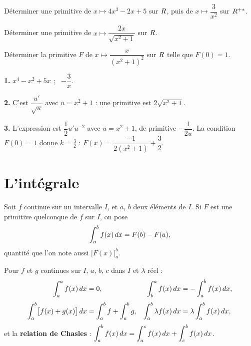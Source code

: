 \begin{entrainement}[primitives]
\exo[\niveau{1}] Déterminer une primitive de $x \mapsto 4x^{3}-2x+5$ sur $R$,
puis de $x \mapsto \dfrac{3}{x^{2}}$ sur $R^{+*}$.

\exo[\niveau{2}] Déterminer une primitive de
$x \mapsto \dfrac{2x}{\sqrt{x^{2}+1}}$ sur $R$.

\exo[\niveau{3}] Déterminer la primitive $F$ de
$x \mapsto \dfrac{x}{\left(x^{2}+1\right)^{2}}$ sur $R$ telle que $F(0) = 1$.
\end{entrainement}

\begin{corrige}
\textbf{1.} $x^{4}-x^{2}+5x$ ; \ $-\dfrac{3}{x}$.

\textbf{2.} C'est $\dfrac{u'}{\sqrt{u}}$ avec $u = x^{2}+1$ : une primitive est
$2\sqrt{x^{2}+1}$.

\textbf{3.} L'expression est $\dfrac{1}{2}u'u^{-2}$ avec $u = x^{2}+1$, de
primitive $-\dfrac{1}{2u}$. La condition $F(0)=1$ donne $k = \tfrac32$ :
$F(x) = \dfrac{-1}{2(x^{2}+1)} + \dfrac{3}{2}$.
\end{corrige}

\section{L'intégrale}

\begin{definition}
Soit $f$ continue sur un intervalle $I$, et $a$, $b$ deux éléments de $I$. Si
$F$ est une primitive quelconque de $f$ sur $I$, on pose
\[
  \int_{a}^{b} f(x)\,dx = F(b)-F(a),
\]
quantité que l'on note aussi $\bigl[F(x)\bigr]_{a}^{b}$.
\end{definition}

\begin{propriete}
Pour $f$ et $g$ continues sur $I$, $a$, $b$, $c$ dans $I$ et $\lambda$ réel :
\begin{align*}
  \int_{a}^{a} f(x)\,dx &= 0, &
  \int_{b}^{a} f(x)\,dx &= -\int_{a}^{b} f(x)\,dx, \\[0.3em]
  \int_{a}^{b} \bigl[f(x)+g(x)\bigr]\,dx &= \int_{a}^{b} f + \int_{a}^{b} g, &
  \int_{a}^{b} \lambda f(x)\,dx &= \lambda \int_{a}^{b} f(x)\,dx,
\end{align*}
et la \textbf{relation de Chasles} :
$\displaystyle\int_{a}^{b} f(x)\,dx = \int_{a}^{c} f(x)\,dx + \int_{c}^{b} f(x)\,dx$.
\end{propriete}

